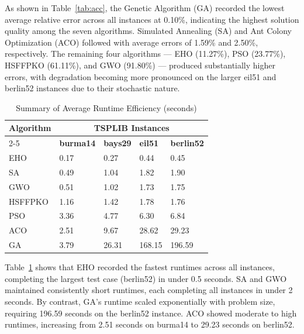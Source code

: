 As shown in Table~\ref{tab:acc}, the Genetic Algorithm (GA) recorded the
lowest average relative error across all instances at 0.10\%, indicating
the highest solution quality among the seven algorithms. Simulated
Annealing (SA) and Ant Colony Optimization (ACO) followed with average
errors of 1.59\% and 2.50\%, respectively. The remaining four algorithms
— EHO (11.27\%), PSO (23.77\%), HSFFPKO (61.11\%), and GWO (91.80\%) —
produced substantially higher errors, with degradation becoming more
pronounced on the larger eil51 and berlin52 instances due to their
stochastic nature.
 
 
\begin{table}[H]
    \centering
    \singlespacing
    \caption{Summary of Average Runtime Efficiency (seconds)}
    \label{tab:runtime}
    \renewcommand{\arraystretch}{1.2}
    \begin{tabularx}{\linewidth}{XXXXX}
        \toprule
        \multirow{2}{*}{\textbf{Algorithm}} &
        \multicolumn{4}{c}{\textbf{TSPLIB Instances}} \\
        \cmidrule(lr){2-5}
         & \textbf{burma14} & \textbf{bays29} & \textbf{eil51} &
           \textbf{berlin52} \\
        \midrule
        EHO     & 0.17 & 0.27  & 0.44   & 0.45   \\
        SA      & 0.49 & 1.04  & 1.82   & 1.90   \\
        GWO     & 0.51 & 1.02  & 1.73   & 1.75   \\
        HSFFPKO & 1.16 & 1.42  & 1.78   & 1.76   \\
        PSO     & 3.36 & 4.77  & 6.30   & 6.84   \\
        ACO     & 2.51 & 9.67  & 28.62  & 29.23  \\
        GA      & 3.79 & 26.31 & 168.15 & 196.59 \\
        \bottomrule
    \end{tabularx}
\end{table}
 
Table~\ref{tab:runtime} shows that EHO recorded the fastest runtimes
across all instances, completing the largest test case (berlin52) in under
0.5 seconds. SA and GWO maintained consistently short runtimes, each
completing all instances in under 2 seconds. By contrast, GA's runtime
scaled exponentially with problem size, requiring 196.59 seconds on the
berlin52 instance. ACO showed moderate to high runtimes, increasing from
2.51 seconds on burma14 to 29.23 seconds on berlin52.
 
